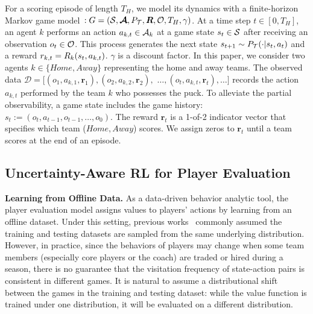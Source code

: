 \documentclass{article}
\newcommand{\horizon}{T_{H}}
\newcommand{\state}{s}
\newcommand{\observation}{o}
\newcommand{\action}{a}
\newcommand{\transition}{t}
\newcommand{\reward}{r}
\newcommand{\agentIndex}{k}
\newcommand{\gameIndex}{j}
\newcommand{\dataset}{\mathcal{D}}
\begin{document}
For a scoring episode of length $\horizon$, we model its dynamics with a finite-horizon Markov game model~\cite{Littman1994MarkovGame}$: G=(\mathcal{\MakeUppercase{\state}}, \boldsymbol{\mathcal{\MakeUppercase{\action}}}, P_{\mathcal{\MakeUppercase{\transition}}}, \boldsymbol{\MakeUppercase{\reward}}, \mathcal{\MakeUppercase{\observation}},\horizon,\gamma)$. 
At a time step $t\in[0,\horizon]$, an agent $\agentIndex$ performs an action $\action_{\agentIndex,t} \in \mathcal{\MakeUppercase{\action}}_{\agentIndex}$ at a game state $\state_{t} \in \mathcal{\MakeUppercase{\state}}$ after receiving an observation $\observation_{t} \in \mathcal{\MakeUppercase{\observation}}$. 
This process generates the next state $\state_{t+1} \sim P_{\mathcal{\MakeUppercase{\transition}}}(\cdot|\state_t, \action_t)$ and a reward
$\reward_{k,t}=\MakeUppercase{\reward}_{\agentIndex}(\state_{t},\action_{\agentIndex,t})$. $\gamma$ is a discount factor.
In this paper, we consider two agents $\agentIndex\in\{Home, Away\}$ representing the home and away teams. The observed data $\dataset=[(\observation_1,\action_{\agentIndex,1},\boldsymbol{\reward}_{1}),(\observation_2,\action_{\agentIndex,2},\boldsymbol{\reward}_{2}),$ $\ldots,(\observation_t,\action_{\agentIndex,t},\boldsymbol{\reward}_{t}),\ldots]$ records the action $\action_{\agentIndex,t}$ performed by the team $\agentIndex$ who possesses the puck.  To alleviate the partial observability, a game state includes the game history: $\state_{t} := (\observation_t,\action_{t-1},\observation_{t-1},\ldots,\observation_{0})$. The reward $\boldsymbol{\reward}_{t}$ is a 1-of-2 indicator vector that specifies which team ($Home, Away$) scores. We assign zeros to $\boldsymbol{\reward}_{t}$ until a team scores at the end of an episode.\vspace{-0.05in}
\subsection{Uncertainty-Aware RL for Player Evaluation}\label{subsec:offline-problem}
\vspace{-0.05in}
\noindent\textbf{Learning from Offline Data.} As a data-driven behavior analytic tool, the player evaluation model assigns values to players' actions by learning from an offline dataset. Under this setting, previous works~\cite{Routley2015Markov,Liu2018DRL,Liu2020soccer,Decroos2019Actions} commonly assumed the training and testing datasets are sampled from the same underlying distribution. However, in practice, since the behaviors of players may change when some team members (especially core players or the coach) are traded or hired during a season, there is no guarantee that the visitation frequency of state-action pairs is consistent in different games. It is natural to assume a distributional shift between the games in the training and testing dataset: while the value function is trained under one distribution, it will be evaluated on a different distribution.
\end{document}
